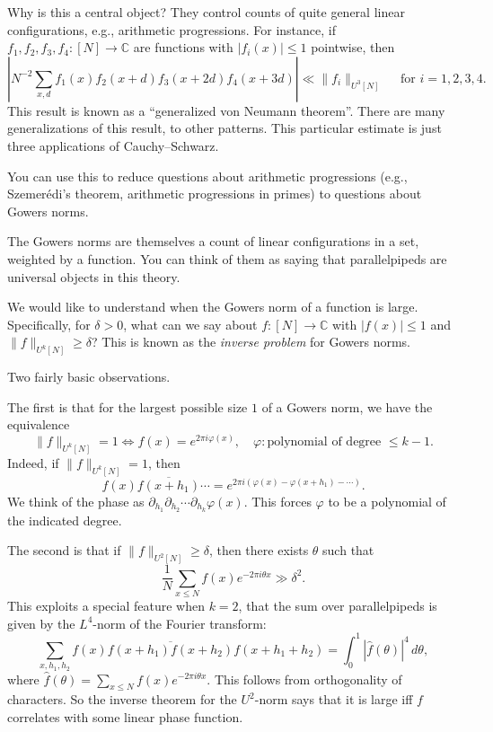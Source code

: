 \documentclass[reqno]{amsart} 
\numberwithin{theorem}{section}
\numberwithin{equation}{section}
\begin{document}
Why is this a central object?  They control counts of quite general linear configurations, e.g., arithmetic progressions.  For instance, if $f_1, f_2, f_3, f_4 :[N] \rightarrow \mathbb{C}$ are functions with $\lvert f_i(x) \rvert \leq 1$ pointwise, then
\begin{equation*}
  \left\lvert N^{- 2} \sum_{x, d} f_1(x) f_2(x + d) f_3(x + 2 d) f_4(x + 3 d) \right\rvert
  \ll \lVert f_i \rVert_{U^3[N]}
  \quad \text{ for } i = 1,2,3,4.
\end{equation*}
This result is known as a ``generalized von Neumann theorem''.  There are many generalizations of this result, to other patterns.  This particular estimate is just three applications of Cauchy--Schwarz.

You can use this to reduce questions about arithmetic progressions (e.g., Szemerédi's theorem, arithmetic progressions in primes) to questions about Gowers norms.

The Gowers norms are themselves a count of linear configurations in a set, weighted by a function.  You can think of them as saying that parallelpipeds are universal objects in this theory.

We would like to understand when the Gowers norm of a function is large.  Specifically, for $\delta > 0$, what can we say about $f :[N] \rightarrow \mathbb{C}$ with $\lvert f(x) \rvert \leq 1$ and $\lVert f \rVert_{U^k[N]} \geq \delta$?  This is known as the \emph{inverse problem} for Gowers norms.

Two fairly basic observations.

The first is that for the largest possible size $1$ of a Gowers norm, we have the equivalence
\begin{equation*}
  \lVert f \rVert_{U^k[N]} = 1 \iff f(x) = e^{2 \pi i \varphi(x)}, \quad
  \varphi : \text{polynomial of degree $\leq k - 1$}.
\end{equation*}
Indeed, if $\lVert f \rVert_{U^k[N]} = 1$, then
\begin{equation*}
  f(x) \overline{f(x + h_1)} \dotsb = e^{2 \pi i(\varphi(x) - \varphi(x + h_1) - \dotsb)}.
\end{equation*}
We think of the phase as $\partial_{h_1} \partial_{h_2} \dotsb \partial_{h_k} \varphi(x)$.  This forces $\varphi$ to be a polynomial of the indicated degree.

The second is that if $\lVert f \rVert_{U^2[N]} \geq \delta$, then there exists $\theta$ such that
\begin{equation*}
  \frac{1}{N} \sum_{x \leq N} f(x) e^{- 2 \pi i \theta x}
  \gg \delta^2.
\end{equation*}
This exploits a special feature when $k =2$, that the sum over parallelpipeds is given by the $L^4$-norm of the Fourier transform:
\begin{equation*}
  \sum_{x, h_1, h_2}
  f(x) \overline{f(x + h_1) f(x + h_2)}
  f(x + h_1 + h_2)
  = \int_0^1 \left\lvert \hat{f}(\theta) \right\rvert^4 \, d \theta,
\end{equation*}
where $\hat{f}(\theta) = \sum_{x \leq N} f(x) e^{- 2 \pi i \theta x}$.  This follows from orthogonality of characters.  So the inverse theorem for the $U^2$-norm says that it is large iff $f$ correlates with some linear phase function.
\end{document}
